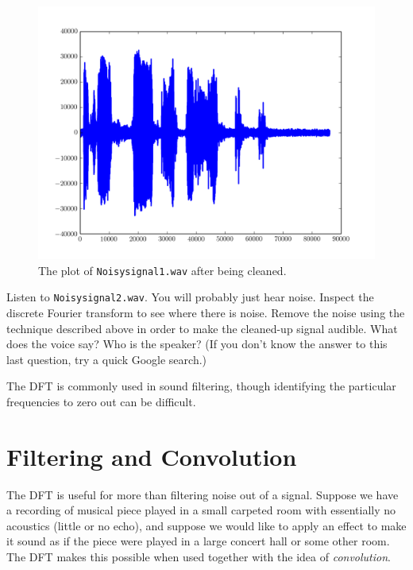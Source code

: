 \begin{figure}
\centering
\includegraphics[width=\textwidth]{Cleanedsignal}
\caption{The plot of \texttt{Noisysignal1.wav} after being cleaned.}
\label{fig:cleansignal}
\end{figure}

\begin{problem}
Listen to \texttt{Noisysignal2.wav}.
You will probably just hear noise.
Inspect the discrete Fourier transform to see where there is noise.
Remove the noise using the technique described above in order to make the cleaned-up signal audible.
What does the voice say?
Who is the speaker?
(If you don't know the answer to this last question, try a quick Google search.)
\end{problem}

The DFT is commonly used in sound filtering, though identifying the particular frequencies to zero out can be difficult.

\section*{Filtering and Convolution}

The DFT is useful for more than filtering noise out of a signal.
Suppose we have a recording of musical piece played in a small carpeted room with essentially no acoustics (little or no echo), and suppose we would like to apply an effect to make it sound as if the piece were played in a large concert hall or some other room.
The DFT makes this possible when used together with the idea of \emph{convolution}.

